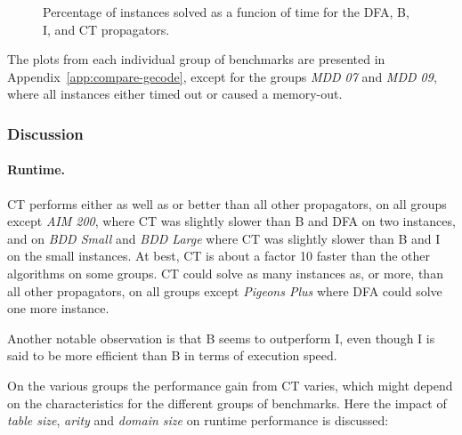 \documentclass[a4paper,11pt]{article}
\numberwithin{equation}{section}
\begin{document}
\begin{figure}
  \centering
  \begin{tikzpicture}%
    
  \end{tikzpicture}
  \caption{Percentage of instances solved as a funcion of time for the DFA, B, I, and CT 
    propagators.}
  \label{fig:total}
\end{figure}

The plots from each individual group of benchmarks are presented 
in Appendix~\ref{app:compare-gecode},
except for the groups \emph{MDD 07} and \emph{MDD 09}, where all instances
either timed out or caused a memory-out.

\subsubsection{Discussion}

\paragraph{Runtime.}
CT performs either as well as or better than all other propagators,
on all groups except \emph{AIM 200}, where CT was slightly slower than B and DFA
on two instances, and on \emph{BDD Small} and \emph{BDD Large} where CT was slightly
slower than B and I on the small instances. At best, CT is about a factor 10 faster
than the other algorithms on some groups.
CT could solve as many instances as, or more, than all other propagators,
on all groups except \emph{Pigeons Plus} where DFA could solve one more instance.

Another notable observation is that B seems to outperform I, even though I is said to
be more efficient than B in terms of execution speed.

On the various groups the performance gain from CT varies, which might depend
on the characteristics for the different groups of benchmarks. Here the impact
of \emph{table size}, \emph{arity} and \emph{domain size} on runtime performance
is discussed:
\end{document}
